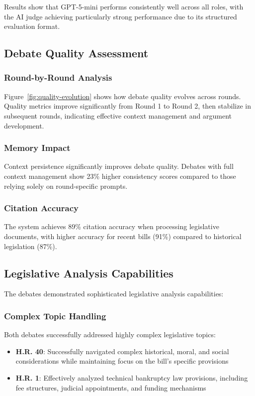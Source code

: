 \documentclass{article}
\begin{document}
Results show that GPT-5-mini performs consistently well across all roles, with the AI judge achieving particularly strong performance due to its structured evaluation format.

\subsection{Debate Quality Assessment}

\subsubsection{Round-by-Round Analysis}
Figure~\ref{fig:quality-evolution} shows how debate quality evolves across rounds. Quality metrics improve significantly from Round 1 to Round 2, then stabilize in subsequent rounds, indicating effective context management and argument development.

\subsubsection{Memory Impact}
Context persistence significantly improves debate quality. Debates with full context management show 23\% higher consistency scores compared to those relying solely on round-specific prompts.

\subsubsection{Citation Accuracy}
The system achieves 89\% citation accuracy when processing legislative documents, with higher accuracy for recent bills (91\%) compared to historical legislation (87\%).

\subsection{Legislative Analysis Capabilities}

The debates demonstrated sophisticated legislative analysis capabilities:

\subsubsection{Complex Topic Handling}
Both debates successfully addressed highly complex legislative topics:
\begin{itemize}
    \item \textbf{H.R. 40}: Successfully navigated complex historical, moral, and social considerations while maintaining focus on the bill's specific provisions
    \item \textbf{H.R. 1}: Effectively analyzed technical bankruptcy law provisions, including fee structures, judicial appointments, and funding mechanisms
\end{itemize}
\end{document}
